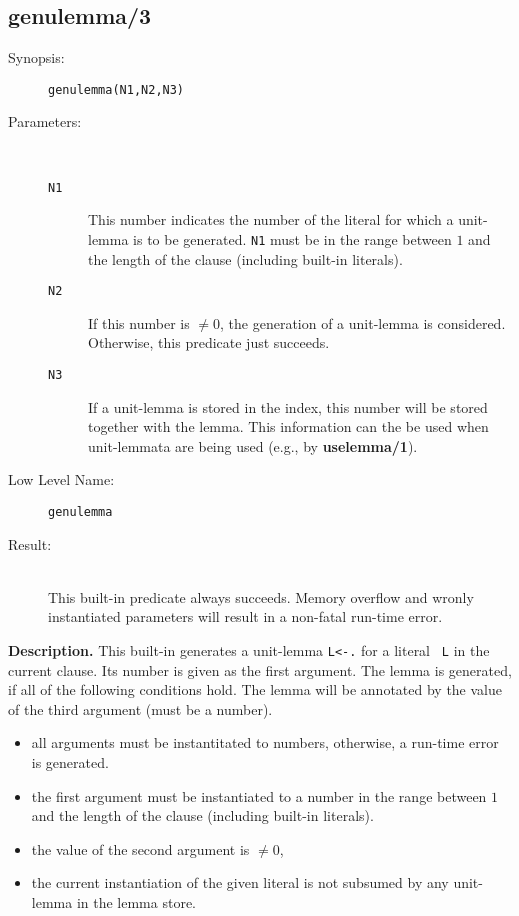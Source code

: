 %
%
%
\subsection{genulemma/3}

\begin{description}
\item[Synopsis:]
	{\tt genulemma(N1,N2,N3)}
\item[Parameters:]\ \\[-0.5cm]
	\begin{description}
	\item[{\tt N1}]
        This number indicates the number of the literal for which
        a unit-lemma is to be generated. {\tt N1} must be in the
        range between $1$ and the length of the clause (including
        built-in literals).
        \item[{\tt N2}]
        If this number is $\neq 0$, the generation of a unit-lemma
        is considered. Otherwise, this predicate just succeeds.
        \item[{\tt N3}]
        If a unit-lemma is stored in the index, this number will be
        stored together with the lemma. This information can the
        be used when unit-lemmata are being used (e.g., by {\bf uselemma/1}).
        \end{description}
\item[Low Level Name:]
	{\tt genulemma}
\item[Result:]\ \\
        This built-in predicate always succeeds. Memory overflow and
        wronly instantiated parameters will result in a
        non-fatal run-time error.
\end{description}

\vspace*{0.5cm}
\noindent
{\bf Description.}
This built-in generates a unit-lemma {\tt L<-.} for a literal
{\tt ~L} in the current clause. Its number is given as the first argument.
The lemma is generated, if all of the following
conditions hold.
The lemma will be annotated by the value of the third argument
(must be a number).
 
\begin{itemize}
\item
all arguments must be instantitated to numbers,
otherwise, a run-time error is generated.
\item
the first argument must be instantiated to a number
in the range between $1$ and the length of the clause (including
built-in literals).
\item
the value of the second argument is $\neq 0$,
\item
the current instantiation of the given literal is not subsumed
by any unit-lemma in the lemma store.
\end{itemize}


